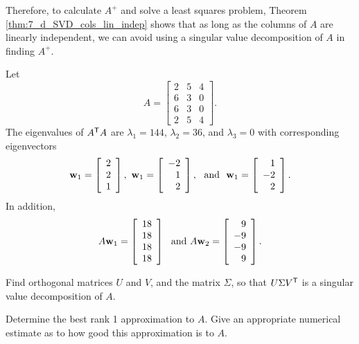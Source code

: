 Therefore, to calculate $A^{+}$ and solve a least squares problem, Theorem \ref{thm:7_d_SVD_cols_lin_indep} shows that as long as the columns of $A$ are linearly independent, we can avoid using a singular value decomposition of $A$ in finding $A^{+}$. 

\label{sec:pseudo_exam}

\ExampleIntro

\begin{example} Let
\[A = \left[ \begin{array}{ccc} 2&5&4\\6&3&0\\6&3&0\\2&5&4 \end{array} \right].\]
The eigenvalues of $A^{\mathsf{T}}A$ are $\lambda_1 = 144$, $\lambda_2 = 36$, and $\lambda_3=0$ with corresponding eigenvectors
\[\mathbf{w}_1 = \left[ \begin{array}{c} 2\\2\\1 \end{array} \right], \ \mathbf{w}_1 = \left[ \begin{array}{r} -2\\1\\2 \end{array} \right], \ \text{ and } \ \mathbf{w}_1 = \left[ \begin{array}{r} 1\\-2\\2 \end{array} \right].\]
In addition,
\[A \mathbf{w}_1 = \left[ \begin{array}{c} 18\\18\\18\\18 \end{array} \right] \ \text{ and } A \mathbf{w}_2 = \left[ \begin{array}{r} 9\\-9\\-9\\9 \end{array} \right].\]
\ba

\item Find orthogonal matrices $U$ and $V$, and the matrix $\Sigma$, so that $U \Sigma V^{\mathsf{T}}$ is a singular value decomposition of $A$.

\item Determine the best rank 1 approximation to $A$. Give an appropriate numerical estimate as to how good this approximation is to $A$.


\end{example}
